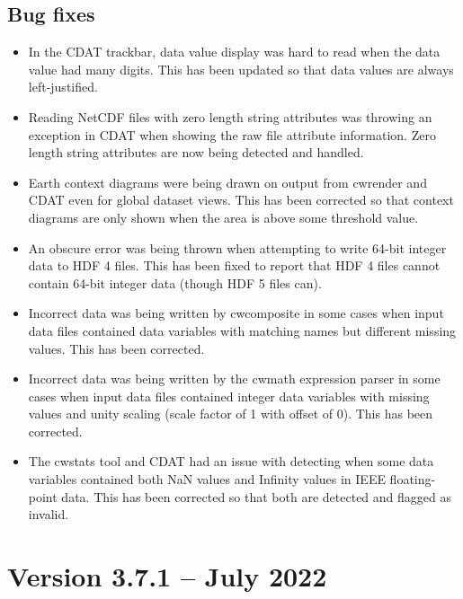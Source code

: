 \subsection*{ Bug fixes}
\begin{itemize}

\item In the CDAT trackbar, data value display was hard to read when the
data value had many digits.  This has been updated so that data values are 
always left-justified.

\item Reading NetCDF files with zero length string attributes was throwing
an exception in CDAT when showing the raw file attribute information.  Zero
length string attributes are now being detected and handled.

\item Earth context diagrams were being drawn on output from cwrender and
CDAT even for global dataset views.  This has been corrected so that context
diagrams are only shown when the area is above some threshold value.

\item An obscure error was being thrown when attempting to write 64-bit integer
data to HDF 4 files.  This has been fixed to report that HDF 4 files cannot 
contain 64-bit integer data (though HDF 5 files can).

\item Incorrect data was being written by cwcomposite in some cases when input
data files contained data variables with matching names but different missing 
values.  This has been corrected.

\item Incorrect data was being written by the cwmath expression parser in 
some cases when input data files contained integer data variables with 
missing values and unity scaling (scale factor of 1 with offset of 0).  This 
has been corrected.

\item The cwstats tool and CDAT had an issue with detecting when some data 
variables contained both NaN values and Infinity values in IEEE 
floating-point data.  This has been corrected so that both are detected 
and flagged as invalid.

\end{itemize}


\section{Version 3.7.1 -- July 2022}

